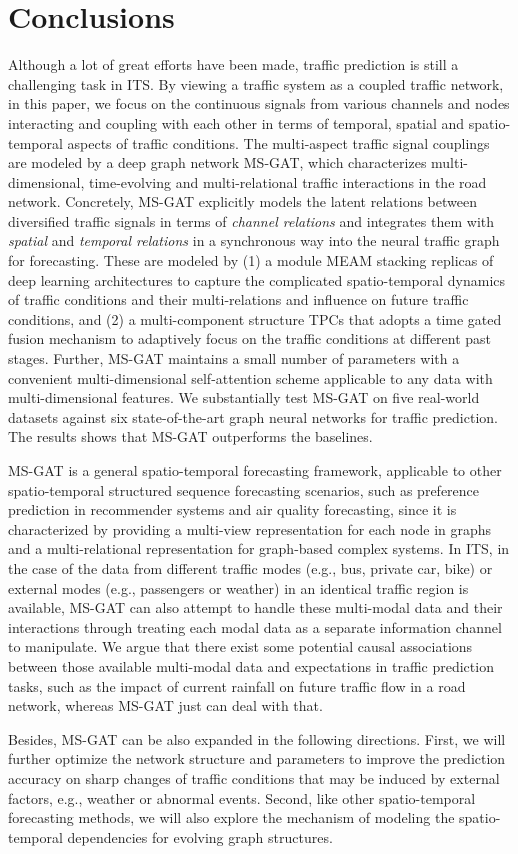 \section{Conclusions}
Although a lot of great efforts have been made, traffic prediction is still a challenging task in ITS. By viewing a traffic system as a coupled traffic network, in this paper, we focus on the continuous signals from various channels and nodes interacting and coupling with each other in terms of temporal, spatial and spatio-temporal aspects of traffic conditions. The multi-aspect traffic signal couplings are modeled by a deep graph network MS-GAT, which characterizes multi-dimensional, time-evolving and multi-relational traffic interactions in the road network. Concretely, MS-GAT explicitly models the latent relations between diversified traffic signals in terms of \textit{channel relations} and integrates them  with \textit{spatial} and \textit{temporal relations} in a synchronous way into the neural traffic graph for forecasting. These are modeled by (1) a module MEAM stacking replicas of deep learning architectures to capture the complicated spatio-temporal dynamics of traffic conditions and their multi-relations and influence on future traffic conditions, and (2) a multi-component structure TPCs that adopts a time gated fusion mechanism to adaptively focus on the traffic conditions at different past stages. Further, MS-GAT maintains a small number of parameters with a convenient multi-dimensional self-attention scheme applicable to any data with multi-dimensional features. We substantially test MS-GAT on five real-world datasets against six state-of-the-art graph neural networks for traffic prediction. The results shows that MS-GAT outperforms the baselines. 

MS-GAT is a general spatio-temporal forecasting framework, applicable to other spatio-temporal structured sequence forecasting scenarios, such as preference prediction in recommender systems and air quality forecasting, since it is characterized by providing a multi-view representation for each node in graphs and a multi-relational representation for graph-based complex systems. In ITS, in the case of the data from different traffic modes (e.g., bus, private car, bike) or external modes (e.g., passengers or weather) in an identical traffic region is available, MS-GAT can also attempt to handle these multi-modal data and their interactions through treating each modal data as a separate information channel to manipulate. We argue that there exist some potential causal associations between those available multi-modal data and expectations in traffic prediction tasks, such as the impact of current rainfall on future traffic flow in a road network, whereas MS-GAT just can deal with that. 

Besides, MS-GAT can be also expanded in the following directions. First, we will further optimize the network structure and parameters to improve the prediction accuracy on sharp changes of traffic conditions that may be induced by external factors, e.g., weather or abnormal events. Second, like other spatio-temporal forecasting methods, we will also explore the mechanism of modeling the spatio-temporal dependencies for evolving graph structures.